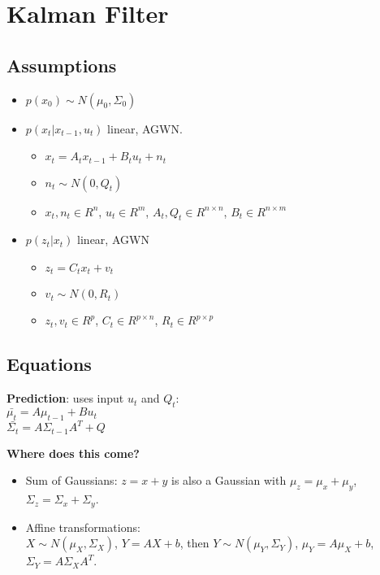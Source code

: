 \section{Kalman Filter}
\subsection*{Assumptions}
\begin{itemize}
  \item $p(x_0) \sim N(\mu_0, \Sigma_0)$
  \item $p(x_t|x_{t-1}, u_t)$ linear, AGWN.
    \begin{itemize}
      \item $x_t = A_t x_{t-1} + B_t u_t + n_t$
      \item $n_t \sim N(0, Q_t)$
      \item $x_t, n_t \in R^n$, $u_t \in R^m$, 
        $A_t, Q_t \in R^{n\times n}$, $B_t \in R^{n \times m}$
    \end{itemize}
  \item $p(z_t|x_t)$ linear, AGWN
    \begin{itemize}
      \item $z_t = C_t x_t + v_t$
      \item $v_t \sim N(0, R_t)$
      \item $z_t, v_t \in R^p$, $C_t \in R^{p \times n}$, $R_t \in R^{p
        \times p}$
    \end{itemize}
\end{itemize}

\subsection*{Equations}
\textbf{Prediction}: uses input $u_t$ and $Q_t$:\\
$\bar{\mu_t} = A \mu_{t-1} + B u_t$ \\
$\bar{\Sigma_t} = A \Sigma_{t-1} A^T + Q$

\textbf{Where does this come?}
\begin{itemize}
  \item Sum of Gaussians: $z = x + y$ is also a Gaussian with $\mu_z =
    \mu_x + \mu_y$, $\Sigma_z = \Sigma_x + \Sigma_y$.
  \item Affine transformations: \\$X \sim N(\mu_X, \Sigma_X)$, $Y= AX +
    b$, then $Y \sim N(\mu_Y, \Sigma_Y)$, $\mu_Y = A \mu_X + b$,\\
    $\Sigma_Y = A \Sigma_X A^T$.
\end{itemize}

